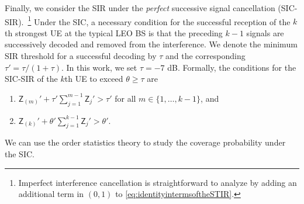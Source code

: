 \documentclass[lettersize,journal]{IEEEtran}
\begin{document}



Finally, we consider the SIR under the \textit{perfect} successive signal cancellation (SIC-SIR).~\footnote{Imperfect interference cancellation is straightforward to analyze by adding an additional term in $(0,1)$ \cite[Eq. (6.21)]{alma998193414406526} to \eqref{eq:identityintermsoftheSTIR}.} Under the SIC, a necessary condition for the successful reception of the $k$th strongest UE at the typical LEO BS is that the preceding $k-1$ signals are successively decoded and removed from the interference. We denote the minimum SIR threshold for a successful decoding by $\tau$ and the corresponding $\tau' = \tau/(1+\tau)$. In this work, we set $\tau = -7$ dB. Formally, the conditions for the SIC-SIR of the $k$th UE to exceed $\theta \geq \tau$ are \begin{enumerate}
\item $ \mathsf{Z}_{(m)}'+\tau'\sum_{j=1}^{m-1}\mathsf{Z}_j'>\tau'$ { for all } $m \in \{1, \dots, k-1\}$,\textup{ and} 
  \item $\mathsf{Z}_{(k)}'+\theta'\sum_{j=1}^{k-1}\mathsf{Z}_j'>\theta'.$
\end{enumerate}  We can use the order statistics theory to study the coverage probability under the SIC. %
\end{document}
